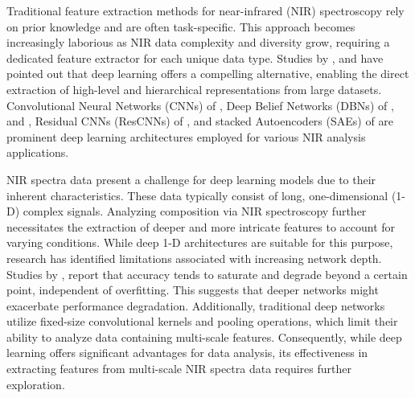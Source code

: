 \documentclass[10pt, a4paper, oneside]{article}
\begin{document}
Traditional feature extraction methods for near-infrared (NIR) spectroscopy rely on prior knowledge and are often task-specific. This approach becomes increasingly laborious as NIR data complexity and diversity grow, requiring a dedicated feature extractor for each unique data type. Studies by \cite{zhu2015hierarchical}, and \cite{takanobu2019hierarchical} have pointed out that deep learning offers a compelling alternative, enabling the direct extraction of high-level and hierarchical representations from large datasets. Convolutional Neural Networks (CNNs) of \cite{chakravartula2022use}, Deep Belief Networks (DBNs) of \cite{guindo2021potential}, and \cite{yang2017deep}, Residual CNNs (ResCNNs) of \cite{chen2022rapid}, and stacked Autoencoders (SAEs) of \cite{zihao2020near} are prominent deep learning architectures employed for various NIR analysis applications. 

NIR spectra data present a challenge for deep learning models due to their inherent characteristics. These data typically consist of long, one-dimensional (1-D) complex signals. Analyzing composition via NIR spectroscopy further necessitates the extraction of deeper and more intricate features to account for varying conditions. While deep 1-D architectures are suitable for this purpose, research has identified limitations associated with increasing network depth. Studies by \cite{srivastava2015highway}, \cite{he2015convolutional} report that accuracy tends to saturate and degrade beyond a certain point, independent of overfitting. This suggests that deeper networks might exacerbate performance degradation. Additionally, traditional deep networks utilize fixed-size convolutional kernels and pooling operations, which limit their ability to analyze data containing multi-scale features. Consequently, while deep learning offers significant advantages for data analysis, its effectiveness in extracting features from multi-scale NIR spectra data requires further exploration.
\end{document}
